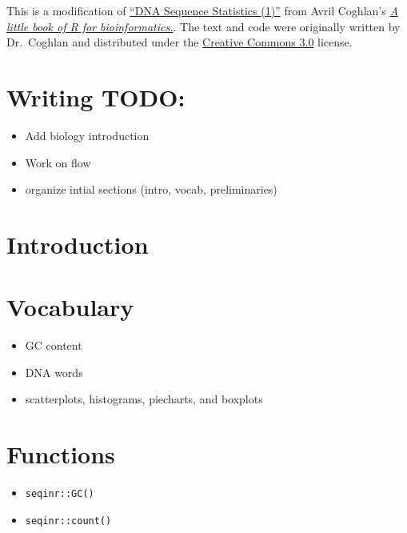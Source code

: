 \documentclass[
]{book}
\providecommand{\tightlist}{%
  \setlength{\itemsep}{0pt}\setlength{\parskip}{0pt}}
\begin{document}
This is a modification of \href{https://a-little-book-of-r-for-bioinformatics.readthedocs.io/en/latest/src/chapter1.html}{``DNA Sequence Statistics (1)''} from Avril Coghlan's \href{https://a-little-book-of-r-for-bioinformatics.readthedocs.io/en/latest/index.html}{\emph{A little book of R for bioinformatics.}}. The text and code were originally written by Dr.~Coghlan and distributed under the \href{https://creativecommons.org/licenses/by/3.0/us/}{Creative Commons 3.0} license.

\hypertarget{writing-todo}{%
\section{Writing TODO:}\label{writing-todo}}

\begin{itemize}
\tightlist
\item
  Add biology introduction
\item
  Work on flow
\item
  organize intial sections (intro, vocab, preliminaries)
\end{itemize}

\hypertarget{introduction}{%
\section{Introduction}\label{introduction}}

\hypertarget{vocabulary-1}{%
\section{Vocabulary}\label{vocabulary-1}}

\begin{itemize}
\tightlist
\item
  GC content
\item
  DNA words
\item
  scatterplots, histograms, piecharts, and boxplots
\end{itemize}

\hypertarget{functions}{%
\section{Functions}\label{functions}}

\begin{itemize}
\tightlist
\item
  \texttt{seqinr::GC()}
\item
  \texttt{seqinr::count()}
\end{itemize}
\end{document}
